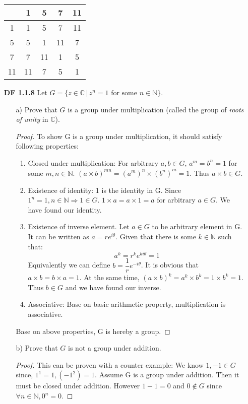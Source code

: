 \documentclass[11pt, oneside]{article}
\newcommand{\N}{\mathbb N}
\newcommand{\C}{\mathbb C}
\begin{document}
\begin{enumerate}
\begin{center}
 \begin{tabular}{||c c c c c||} 
 \hline
  & 1 & 5& 7 & 11  \\ [0.5ex] 
 \hline\hline
 1 & 1 & 5 & 7 & 11 \\ 
 \hline
 5 & 5 & 1 & 11 & 7 \\
 \hline
 7 & 7 & 11 & 1 & 5  \\
 \hline
 11 & 11 & 7 & 5 & 1 \\
 \hline
 
\end{tabular}
\end{center}


\item[{\bf DF 1.1.8}] Let $G=\{z\in \C \, | \,z^n=1 \text{ for some } n\in \N\}$.
\begin{enumerate}
\item[a)] Prove that $G$ is a group under multiplication (called the group of {\it roots of unity} in $\C$).
\begin{proof}To show G is a group under multiplication, it should satisfy following properties:
\begin{enumerate}
    \item Closed under multiplication: For arbitrary $a,b \in G$, $a^m = b^n = 1$  for some $m, n \in \N$. $(a\times b)^{mn}= (a^m)^n\times (b^n)^m=1$. Thus $a\times b\in G$.
    \item Existence of identity: 1 is the identity in G. Since $1^n=1, n\in \N\Rightarrow{} 1\in G$. $1\times a=a\times 1=a$ for arbitrary $a\in G$. We have found our identity.
    \item Existence of inverse element. Let $a\in G$ to be arbitrary element in G. It can be written as $a=re^{i\theta}$. Given that there is some $k\in \N$ such that:
    \[a^k=r^ke^{ki\theta}=1\]
    Equivalently we can define $b=\dfrac{1}{r}e^{-i\theta}$. It is obvious that $a\times b=b\times a=1$. At the same time, $(a\times b)^k=a^k \times b^k = 1 \times b^k = 1$. Thus $b\in G$ and we have found our inverse.
    \item Associative: Base on basic arithmetic property, multiplication is associative. 
\end{enumerate}
Base on above properties, G is hereby a group.
\end{proof}
\item[b)] Prove that $G$ is not a group under addition.\\
\begin{proof}
This can be proven with a counter example:
We know $1,-1\in G$ since, $1^1=1, (-1^2)=1$. Assume G is a group under addition. Then it must be closed under addition. However $1-1=0$ and $0\notin G$ since $\forall n\in \N, 0^n=0$.


\end{proof}
\end{enumerate}
\end{enumerate}
\end{document}

